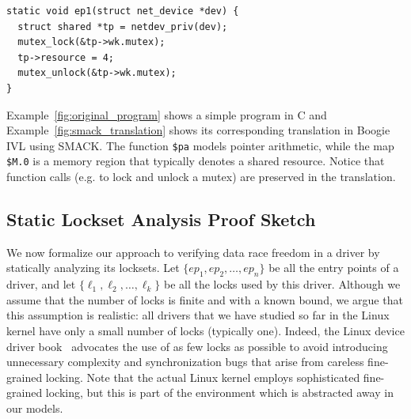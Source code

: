 {\begin{lstlisting}[caption = Simple networking entry point in C, label = fig:original_program]
static void ep1(struct net_device *dev) {
  struct shared *tp = netdev_priv(dev);
  mutex_lock(&tp->wk.mutex);
  tp->resource = 4;
  mutex_unlock(&tp->wk.mutex);
}
\end{lstlisting}

Example~\ref{fig:original_program} shows a simple program in C and Example~\ref{fig:smack_translation} shows its corresponding translation in Boogie IVL using SMACK. The function \texttt{\$pa} models pointer arithmetic, while the map \texttt{\$M.0} is a memory region that typically denotes a shared resource. Notice that function calls (e.g. to lock and unlock a mutex) are preserved in the translation.


\subsection{Static Lockset Analysis Proof Sketch}
\label{whoop:proof}

We now formalize our approach to verifying data race freedom in a driver by statically analyzing its locksets. Let $\{_{1}, _{2}, \dotsc, _{n}\}$ be all the entry points of a driver, and let $\{\ell_{1}, \ell_{2}, \dotsc, \ell_{k}\}$ be all the locks used by this driver. Although we assume that the number of locks is finite and with a known bound, we argue that this assumption is realistic: all drivers that we have studied so far in the Linux kernel have only a small number of locks (typically one). Indeed, the Linux device driver book~\cite{corbet2005linux} advocates the use of as few locks as possible to avoid introducing unnecessary complexity and synchronization bugs that arise from careless fine-grained locking. Note that the actual Linux kernel employs sophisticated fine-grained locking, but this is part of the environment which is abstracted away in our models.

}
